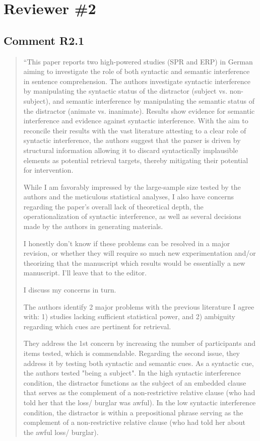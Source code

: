 \documentclass[12pt]{article}
\begin{document}
\begin{quote}
\end{quote}

\section*{Reviewer \#2} 
\subsection*{Comment R2.1}
\begin{quote}
``This paper reports two high-powered studies (SPR and ERP) in German aiming to investigate the role of both syntactic and semantic interference in sentence comprehension. The authors investigate syntactic interference by manipulating the syntactic status of the distractor (subject vs. non-subject), and semantic interference by manipulating the semantic status of the distractor (animate vs. inanimate). Results show evidence for semantic interference and evidence against syntactic interference. With the aim to reconcile their results with the vast literature attesting to a clear role of syntactic interference, the authors suggest that the parser is driven by structural information allowing it to discard syntactically implausible elements as potential retrieval targets, thereby mitigating their potential for intervention.

While I am favorably impressed by the large-sample size tested by the authors and the meticulous statistical analyses, I also have concerns regarding the paper's overall lack of theoretical depth, the operationalization of syntactic interference, as well as several decisions made by the authors in generating materials.

I honestly don't know if these problems can be resolved in a major revision, or whether they will require so much new experimentation and/or theorizing that the manuscript which results would be essentially a new manuscript. I'll leave that to the editor.

I discuss my concerns in turn.

The authors identify 2 major problems with the previous literature I agree with: 1) studies lacking sufficient statistical power, and 2) ambiguity regarding which cues are pertinent for retrieval.

They address the 1st concern by increasing the number of participants and items tested, which is commendable. Regarding the second issue, they address it by testing both syntactic and semantic cues. As a syntactic cue, the authors tested "being a subject". In the high syntactic interference condition, the distractor functions as the subject of an embedded clause that serves as the complement of a non-restrictive relative clause (who had told her that the loss/ burglar was awful). In the low syntactic interference condition, the distractor is within a prepositional phrase serving as the complement of a non-restrictive relative clause (who had told her about the awful loss/ burglar).


\end{quote}
\end{document}
